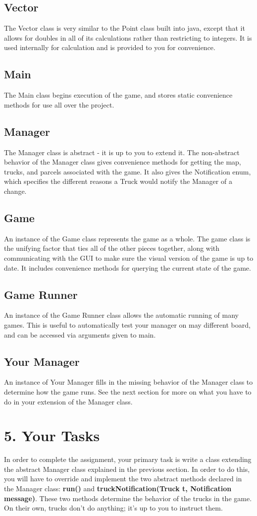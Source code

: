 \documentclass[11pt]{article}
\begin{document}
\subsection{Vector}
The Vector class is very similar to the Point class built into java, except that it allows for doubles in all of its calculations rather than restricting to integers. It is used internally for calculation and is provided to you for convenience.
\subsection{Main}
The Main class begins execution of the game, and stores static convenience methods for use all over the project.
\subsection{Manager}
The Manager class is abstract - it is up to you to extend it. The non-abstract behavior of the Manager class gives convenience methods for getting the map, trucks, and parcels associated with the game. It also gives the Notification enum, which specifies the different reasons a Truck would notify the Manager of a change.
\subsection{Game}
An instance of the Game class represents the game as a whole. The game class is the unifying factor that ties all of the other pieces together, along with communicating with the GUI to make sure the visual version of the game is up to date. It includes convenience methods for querying the current state of the game.
\subsection{Game Runner}
An instance of the Game Runner class allows the automatic running of many games. This is useful to automatically test your manager on may different board, and can be accessed via arguments given to main.
\subsection{Your Manager}
An instance of Your Manager fills in the missing behavior of the Manager class to determine how the game runs. See the next section for more on what you have to do in your extension of the Manager class.

\newpage
\section{5. Your Tasks}
In order to complete the assignment, your primary task is write a class extending the abstract Manager class explained in the previous section. In order to do this, you will have to override and implement the two abstract methods declared in the Manager class: \textbf{run()} and \textbf{truckNotification(Truck t, Notification message)}. These two methods determine the behavior of the trucks in the game. On their own, trucks don't do anything; it's up to you to instruct them.\\
\end{document}
